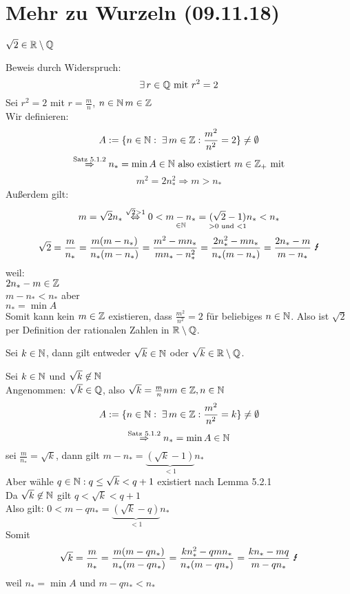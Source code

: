\documentclass[../ana1u.tex]{subfiles}
\begin{document}
\setcounter{section}{2}

\section{Mehr zu Wurzeln (09.11.18)}
\begin{bsp} [Exkurs]
    \begin{beh}
        \(\sqrt{2} \in \mathbb{R} \setminus \mathbb{Q}\)
    \end{beh}
    \begin{bew}
        Beweis durch Widerspruch:
        \[\exists \, r \in \mathbb{Q} \text{ mit } r^2 = 2\]
        Sei \(r^2 = 2\) mit \(r = \frac{m}{n}\), \(n \in \mathbb{N}\, m \in \mathbb{Z}\)\\
        Wir definieren:
        \[A := \{n \in \mathbb{N}: \; \exists \, m \in \mathbb{Z}: \frac{m^2}{n^2} = 2\} \neq \emptyset\]
        \[\overset{\text{Satz 5.1.2}}{\Rightarrow} n_* = \min A \in \mathbb{N} \text{ also existiert } m \in \mathbb{Z}_+ \text{ mit}\]
        \[m^2 = 2n_*^2 \Rightarrow m > n_* \]
        Außerdem gilt:
        \[m = \sqrt{2}n_* \overset{\sqrt{2} > 1}{\Leftrightarrow} 0 < \underset{\in \mathbb{N}}{m - n_*} = \underset{> 0 \text{ und } < 1}{(\sqrt{2} - 1)}n_* < n_*\]
        \[\sqrt{2} = \frac{m}{n_*} = \frac{m(m - n_*)}{n_*(m - n_*)} = \frac{m^2 - mn_*}{mn_* - n_*^2} = \frac{2n_*^2 - mn_*}{n_*(m-n_*)} = \frac{2n_*-m}{m-n_*} \text{ \Lightning}\]
        weil:\\
        \(2n_* - m \in \mathbb{Z}\)\\
        \(m - n_* < n_*\) aber\\
        \(n_* = \min A\)\\
        Somit kann kein \(m \in \mathbb{Z}\) existieren, dass \(\frac{m^2}{n^2} = 2\) für beliebiges \(n \in \mathbb{N}\). Also ist \(\sqrt{2}\) per Definition der rationalen Zahlen in \(\mathbb{R} \setminus \mathbb{Q}\).
    \end{bew}
    \begin{satz}
        Sei \(k \in \mathbb{N}\), dann gilt entweder \(\sqrt{k} \in \mathbb{N}\) oder \(\sqrt{k} \in \mathbb{R} \setminus \mathbb{Q}\).
    \end{satz}
    \begin{bew}
        Sei \(k \in \mathbb{N}\) und \(\sqrt{k} \not\in \mathbb{N}\)\\
        Angenommen: \(\sqrt{k} \in \mathbb{Q}\), also \(\sqrt{k} = \frac{m}{n}n m \in \mathbb{Z}, n \in \mathbb{N}\)\\
        \[A := \{n \in \mathbb{N}: \; \exists \, m \in \mathbb{Z}: \frac{m^2}{n^2} = k\} \neq \emptyset\]
        \[\overset{\text{Satz 5.1.2}}{\Rightarrow} n_* = \min A \in \mathbb{N}\]
        sei \(\frac{m}{n_*} = \sqrt{k}\), dann gilt \(m - n_* = \underbrace{(\sqrt{k}-1)}_{<1}n_*\)\\
        Aber wähle \(q \in \mathbb{N}: q \leq \sqrt{k} < q + 1\) existiert nach Lemma 5.2.1\\
        Da \(\sqrt{k} \not \in \mathbb{N}\) gilt \(q < \sqrt{k} < q + 1\)\\
        Also gilt: \(0 < m - qn_* = \underbrace{(\sqrt{k}-q)}_{<1}n_*\)\\
        Somit
        \[\sqrt{k} = \frac{m}{n_*} = \frac{m(m - qn_*)}{n_*(m - qn_*)} = \frac{kn_*^2 - qmn_*}{n_*(m-qn_*)} = \frac{kn_* - mq}{m - qn_*} \text{ \Lightning}\]
        weil \(n_* = \min A\) und \(m - qn_* < n_*\)
    \end{bew}
\end{bsp}
\end{document}
